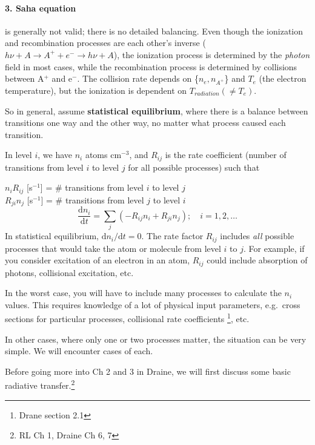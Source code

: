 \documentclass[11pt]{article}
\newcommand{\mar}[1]{\hspace{0pt}\marginpar{-\textcolor{black}{#1}-}}
\begin{document}
\paragraph{3. Saha equation} is generally not valid; there is no detailed
balancing. Even though the ionization and recombination processes are
each other's inverse
\newline
($h\nu + A \rightarrow A^{+} + e^{-} \rightarrow h\nu + A$),
\newline
the ionization process is determined by the \emph{photon} field in most
cases, while the recombination process is determined by collisions between
A$^{+}$ and e$^{-}$. The collision rate depends on \{$n_{e}, n_{A^{+}}$\}
and $T_{e}$ (the electron temperature), but the ionization is dependent on
$T_{radiation} (\neq T_{e})$.

So in general, assume \textbf{statistical equilibrium}, where there is
a balance between transitions one way and the other way, no matter
what process caused each transition.

In level $i$, we have $n_{i}$ atoms cm$^{-3}$, and
$R_{ij}$ is the rate coefficient (number of transitions from level $i$
to level $j$ for all possible processes) such that

$n_{i}R_{ij}$ [s$^{-1}$] = \# transitions from level $i$ to level $j$\\
$R_{ji}n_{j}$ [s$^{-1}$] = \# transitions from level $j$ to level $i$\\

\[
    \frac{\mathrm{d}n_{i}}{\mathrm{d}t} =
    \sum_{j}\left(-R_{ij}n_{i} + R_{ji}n_{j}\right);\quad i=1,2,\ldots
    \]
\mar{23}In statistical equilibrium,
$\mathrm{d}n_{i}/\mathrm{d}t = 0$. The rate factor $R_{ij}$
includes \emph{all} possible processes that would take the atom or
molecule from level $i$ to $j$.
For example, if you consider excitation of an electron in an atom,
$R_{ij}$ could include absorption of photons, collisional excitation, etc.

In the worst case, you will have to include many processes to calculate the
$n_{i}$ values. This requires knowledge of a lot of physical input
parameters, e.g.\ cross sections for particular processes, collisional rate
coefficients \footnote{Drane section 2.1}, etc.

In other cases, where only one or two processes matter, the situation
can be very simple. We will encounter cases of each.

Before going more into Ch 2 and 3 in Draine, we will first discuss
some basic radiative transfer.\footnote{RL Ch 1, Draine Ch 6, 7}
\end{document}
